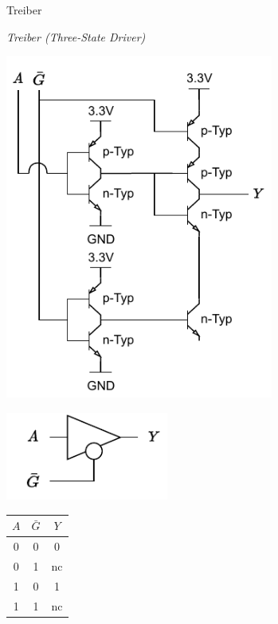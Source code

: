 \begin{defi}{Treiber}
    \begin{center}
        \emph{Treiber (Three-State Driver)}
    \end{center}

    \begin{minipage}{0.5\textwidth}
        \begin{center}
            \includegraphics[width=0.66\textwidth]{includes/figures/defi_driver.pdf}
        \end{center}
    \end{minipage}
    \begin{minipage}{0.5\textwidth}
        \begin{center}
            \includegraphics[width=0.4\textwidth]{includes/figures/defi_driver_symbol.pdf}

            \begin{tabular}{|c|c||c|}
                \hline
                $A$ & $\bar{G}$ & $Y$ \\\hline\hline
                0   & 0         & 0   \\\hline
                0   & 1         & nc  \\\hline
                1   & 0         & 1   \\\hline
                1   & 1         & nc  \\\hline
            \end{tabular}
        \end{center}
    \end{minipage}

\end{defi}

